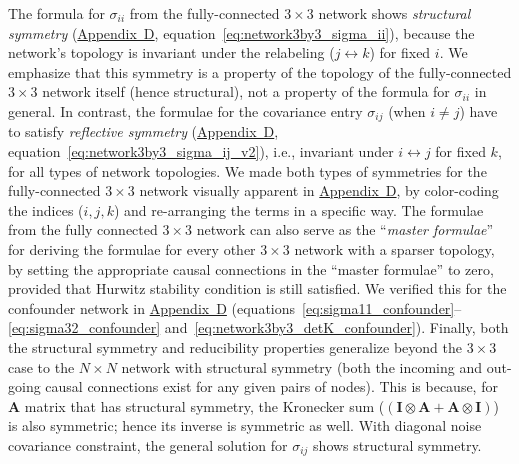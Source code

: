 \documentclass[12pt]{article}
\begin{document}
The formula for $\sigma_{ii}$ from the fully-connected $3\times3$ network shows \textit{structural symmetry} (\hyperref[app:appD]{Appendix~D}, equation~\ref{eq:network3by3_sigma_ii}), because the network's topology is invariant under the relabeling ($j\leftrightarrow k$) for fixed $i$. We emphasize that this symmetry is a property of the topology of the fully-connected $3\times3$ network itself (hence structural), not a property of the formula for $\sigma_{ii}$ in
general. In contrast, the formulae for the covariance entry $\sigma_{ij}$ (when $i \neq j$) have to satisfy 
\textit{reflective symmetry} (\hyperref[app:appD]{Appendix~D}, equation~\ref{eq:network3by3_sigma_ij_v2}), i.e., invariant under
$i\leftrightarrow j$ for fixed $k$, for all types of network topologies. We made both types of symmetries for the fully-connected $3\times3$ network visually apparent in \hyperref[app:appD]{Appendix~D}, by color-coding the indices ($i,j,k$) and re-arranging the terms in a specific way. The formulae from the fully connected $3\times3$ network can also serve as the ``\textit{master
formulae}'' for deriving the formulae for every other $3\times3$ network with a sparser topology, by setting the
appropriate causal connections in the ``master formulae'' to zero, provided that Hurwitz stability condition is still satisfied. We verified this for the confounder network in \hyperref[app:appD]{Appendix~D} (equations~\ref{eq:sigma11_confounder}--\ref{eq:sigma32_confounder}
and~\ref{eq:network3by3_detK_confounder}). Finally, both the structural symmetry and reducibility properties generalize beyond the $3\times3$ case to the $N\times N$ network with structural symmetry (both the incoming and out-going causal connections exist for any given pairs of nodes). This is because, for $\mathbf{A}$ matrix that has structural symmetry, the Kronecker sum ($(\mathbf{I}\otimes\mathbf{A}+\mathbf{A}\otimes\mathbf{I})$) is also symmetric; hence its inverse is symmetric as well. With diagonal noise covariance constraint, the general solution for $\sigma_{ij}$ shows structural symmetry. 

\end{document}
